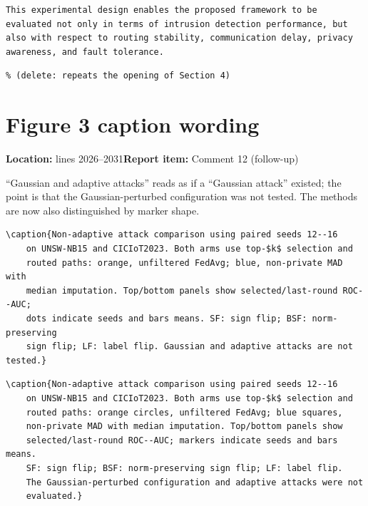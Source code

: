 \documentclass[10pt,a4paper]{article}
\newcommand{\issue}[3]{\section{#1}{\raggedright\noindent\textcolor{note}{\small\textbf{Location:} #2\quad\textbf{Report item:} #3}\par}\smallskip}
\newcommand{\why}[1]{\noindent\textcolor{note}{\small #1}\par\smallskip}
\begin{document}
\begin{before}[lines 1338--1341]
\begin{Verbatim}
This experimental design enables the proposed framework to be
evaluated not only in terms of intrusion detection performance, but
also with respect to routing stability, communication delay, privacy
awareness, and fault tolerance.
\end{Verbatim}
\end{before}
\begin{after}
\begin{Verbatim}
% (delete: repeats the opening of Section 4)
\end{Verbatim}
\end{after}

\issue{Figure 3 caption wording}{lines 2026--2031}{Comment 12 (follow-up)}
\why{``Gaussian and adaptive attacks'' reads as if a ``Gaussian attack'' existed; the point is that the Gaussian-perturbed configuration was not tested. The methods are now also distinguished by marker shape.}

\begin{before}[lines 2026--2031]
\begin{Verbatim}
\caption{Non-adaptive attack comparison using paired seeds 12--16
	on UNSW-NB15 and CICIoT2023. Both arms use top-$k$ selection and
	routed paths: orange, unfiltered FedAvg; blue, non-private MAD with
	median imputation. Top/bottom panels show selected/last-round ROC--AUC;
	dots indicate seeds and bars means. SF: sign flip; BSF: norm-preserving
	sign flip; LF: label flip. Gaussian and adaptive attacks are not tested.}
\end{Verbatim}
\end{before}

\begin{after}
\begin{Verbatim}
\caption{Non-adaptive attack comparison using paired seeds 12--16
	on UNSW-NB15 and CICIoT2023. Both arms use top-$k$ selection and
	routed paths: orange circles, unfiltered FedAvg; blue squares,
	non-private MAD with median imputation. Top/bottom panels show
	selected/last-round ROC--AUC; markers indicate seeds and bars means.
	SF: sign flip; BSF: norm-preserving sign flip; LF: label flip.
	The Gaussian-perturbed configuration and adaptive attacks were not
	evaluated.}
\end{Verbatim}
\end{after}
\end{document}
